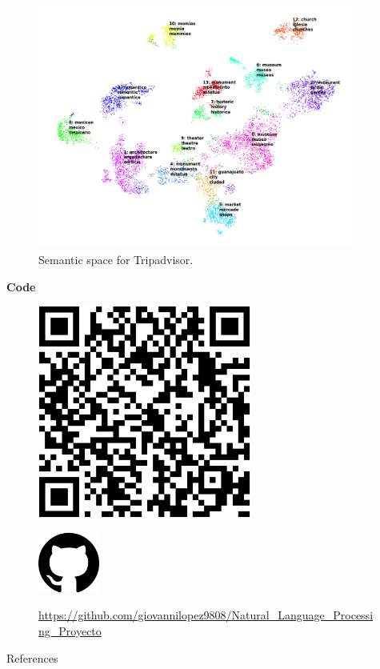 \begin{frame}[fragile=singleslide]{}
  \begin{figure}[ht!]
    \includegraphics[height=8cm]{Graphics/tripadvisor_clustered.png}
    \caption{Semantic space for Tripadvisor.}
  \end{figure}
\end{frame}

\begin{frame}[fragile=singleslide]{\large \textbf{Code}}
  \begin{minipage}{7cm}
    \begin{figure}[ht!]
      \includegraphics[width=7cm]{Graphics/qr.eps}
    \end{figure}
  \end{minipage}
  \begin{minipage}{7cm}
    \begin{figure}[ht!]
      \includegraphics[width=2cm]{Graphics/github.png}\\
      \caption*{\url{https://github.com/giovannilopez9808/Natural_Language_Processing_Proyecto}}
    \end{figure}
  \end{minipage}
\end{frame}


\begin{frame}[allowframebreaks]{References}
  
  
\end{frame}
